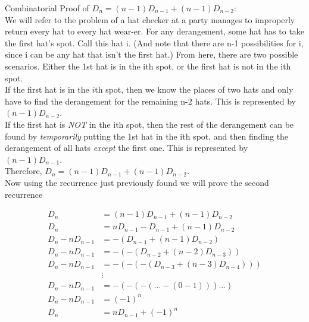 \documentclass[10pt, AMS Euler]{article}
\begin{document}
 Combinatorial Proof of $D_n=(n-1)D_{n-1}+(n-1)D_{n-2}$:\\
 
 We will refer to the problem of a hat checker at a party manages to improperly return every hat to every hat wear-er. For any derangement, some hat has to take the first hat's spot. Call this hat i. (And note that there are n-1 possibilities for i, since i can be any hat that isn't the first hat.) From here, there are two possible scenarios. Either the 1st hat is in the ith spot, or the first hat is not in the ith spot.\\

If the first hat is in the $i$th spot, then we know the places of two hats and only have to find the derangement for the remaining n-2 hats. This is represented by $(n-1)D_{n-2}$.\\

If the first hat is \emph{NOT} in the ith spot, then the rest of the derangement can be found by \emph{temporarily} putting the 1st hat in the ith spot, and then finding the derangement of all hats \emph{except} the first one. This is represented by $(n-1)D_{n-1}$.\\

Therefore, $D_n=(n-1)D_{n-1}+(n-1)D_{n-2}$.\\

 
Now using the recurrence just previously found we will prove the second recurrence


\begin{align*}
    D_n &= (n-1)D_{n-1}+(n-1)D_{n-2}                \\
    D_n &= nD_{n-1}-D_{n-1}+(n-1)D_{n-2}            \\
    D_n - nD_{n-1} &= -(D_{n-1}+(n-1)D_{n-2})       \\
    D_n - nD_{n-1} &= -(-(D_{n-2}+(n-2)D_{n-3}))    \\
    D_n - nD_{n-1} &= -(-(-(D_{n-3}+(n-3)D_{n-4}))) \\
    &\vdots                                         \\
    D_n - nD_{n-1} &= -(-(-(\dots -(0-1)))\dots )   \\
    D_n - nD_{n-1} &= (-1)^n                        \\
    D_n &= nD_{n-1} + (-1)^n                        \\
\end{align*}
\end{document}
